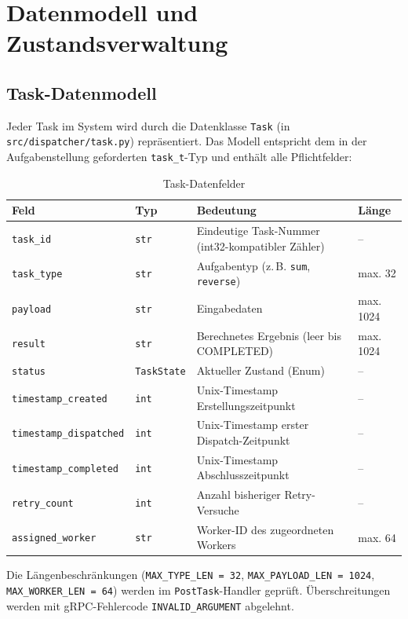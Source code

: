 \section{Datenmodell und Zustandsverwaltung}
\label{sec:datenmodell}

\subsection{Task-Datenmodell}

Jeder Task im System wird durch die Datenklasse \texttt{Task}
(in \texttt{src/dispatcher/task.py}) repräsentiert.
Das Modell entspricht dem in der Aufgabenstellung geforderten
\texttt{task\_t}-Typ und enthält alle Pflichtfelder:

\begin{table}[H]
\centering
\begin{tabular}{m{4.4cm} m{2.2cm} m{6.75cm} m{2cm}}
\toprule
\textbf{Feld} & \textbf{Typ} & \textbf{Bedeutung} & \textbf{Länge} \\
\midrule
\texttt{task\_id}              & \texttt{str}        & Eindeutige Task-Nummer (int32-kompatibler Zähler) & -- \\
\texttt{task\_type}            & \texttt{str}        & Aufgabentyp (z.\,B. \texttt{sum}, \texttt{reverse}) & max. 32 \\
\texttt{payload}               & \texttt{str}        & Eingabedaten                                       & max. 1024 \\
\texttt{result}                & \texttt{str}        & Berechnetes Ergebnis (leer bis COMPLETED)           & max. 1024 \\
\texttt{status}                & \texttt{TaskState}  & Aktueller Zustand (Enum)                           & -- \\
\texttt{timestamp\_created}    & \texttt{int}        & Unix-Timestamp Erstellungszeitpunkt                & -- \\
\texttt{timestamp\_dispatched} & \texttt{int}        & Unix-Timestamp erster Dispatch-Zeitpunkt           & -- \\
\texttt{timestamp\_completed}  & \texttt{int}        & Unix-Timestamp Abschlusszeitpunkt                  & -- \\
\texttt{retry\_count}          & \texttt{int}        & Anzahl bisheriger Retry-Versuche                   & -- \\
\texttt{assigned\_worker}      & \texttt{str}        & Worker-ID des zugeordneten Workers                 & max. 64 \\
\bottomrule
\end{tabular}
\caption{Task-Datenfelder}
\end{table}
\noindent Die Längenbeschränkungen (\texttt{MAX\_TYPE\_LEN = 32}, \texttt{MAX\_PAYLOAD\_LEN = 1024},
\texttt{MAX\_WORKER\_LEN = 64}) werden im \texttt{PostTask}-Handler geprüft.
Überschreitungen werden mit gRPC-Fehlercode \texttt{INVALID\_ARGUMENT} abgelehnt.
\newpage

